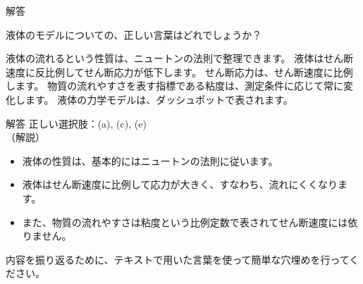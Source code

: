 \documentclass[uplatex,dvipdfmx,a4paper,11pt]{jsarticle}
\begin{document}
\begin{qlist}
\begin{itembox}[l]{解答}
\end{itembox}
	\qitem 液体のモデルについての、正しい言葉はどれでしょうか？
	\begin{qlist2}
		\qitem 液体の流れるという性質は、ニュートンの法則で整理できます。
		\qitem 液体はせん断速度に反比例してせん断応力が低下します。
		\qitem せん断応力は、せん断速度に比例します。
		\qitem 物質の流れやすさを表す指標である粘度は、測定条件に応じて常に変化します。
		\qitem 液体の力学モデルは、ダッシュポットで表されます。
	\end{qlist2}
    \vspace{3mm}
    \begin{itembox}[l]{解答}
    正しい選択肢：(a), (c), (e)\\
    （解説）
	\begin{itemize}
		\item 液体の性質は、基本的にはニュートンの法則に従います。
		\item 液体はせん断速度に比例して応力が大きく、すなわち、流れにくくなります。
		\item また、物質の流れやすさは粘度という比例定数で表されてせん断速度には依りません。
	\end{itemize}
    \end{itembox}
\end{qlist}

内容を振り返るために、テキストで用いた言葉を使って簡単な穴埋めを行ってください。
\end{document}
